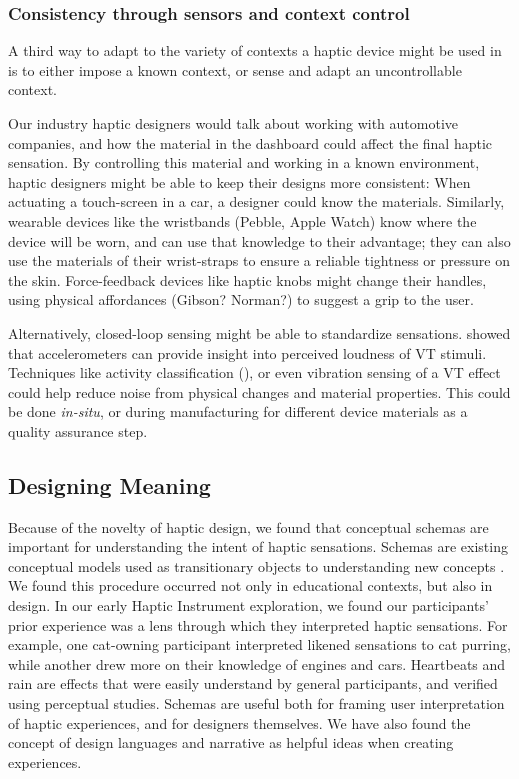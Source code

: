 \subsubsection{Consistency through sensors and context control}
A third way to adapt to the variety of contexts a haptic device might be used in is to either impose a known context, or sense and adapt an uncontrollable context.

Our industry haptic designers would talk about working with automotive companies, and how the material in the dashboard could affect the final haptic sensation.
By controlling this material and working in a known environment, haptic designers might be able to keep their designs more consistent:
When actuating a touch-screen in a car, a designer could know the materials.
Similarly, wearable devices like the wristbands (Pebble, Apple Watch) know where the device will be worn, and can use that knowledge to their advantage; they can also use the materials of their wrist-straps to ensure a reliable tightness or pressure on the skin.
Force-feedback devices like haptic knobs might change their handles, using physical affordances (Gibson? Norman?) to suggest a grip to the user.

Alternatively, closed-loop sensing might be able to standardize sensations.
\citet{Blum2015} showed that accelerometers can provide insight into perceived loudness of VT stimuli.
Techniques like activity classification (\eg \cite{Schneider2013}), or even vibration sensing of a VT effect could help reduce noise from physical changes and material properties.
This could be done \emph{in-situ}, or during manufacturing for different device materials as a quality assurance step.

%
%
\subsection{Designing Meaning}
Because of the novelty of haptic design, we found that conceptual schemas are important for understanding the intent of haptic sensations.
Schemas are existing conceptual models used as transitionary objects to understanding new concepts \cite{Papert1980}.
We found this procedure occurred not only in educational contexts, but also in design.
In our early Haptic Instrument exploration, we found our participants' prior experience was a lens through which they interpreted haptic sensations.
For example, one cat-owning participant interpreted likened sensations to cat purring, while another drew more on their knowledge of engines and cars.
Heartbeats and rain \cite{Israr2014} are effects that were easily understand by general participants, and verified using perceptual studies.
Schemas are useful both for framing user interpretation of haptic experiences, and for designers themselves.
We have also found the concept of design languages and narrative as helpful ideas when creating experiences.

